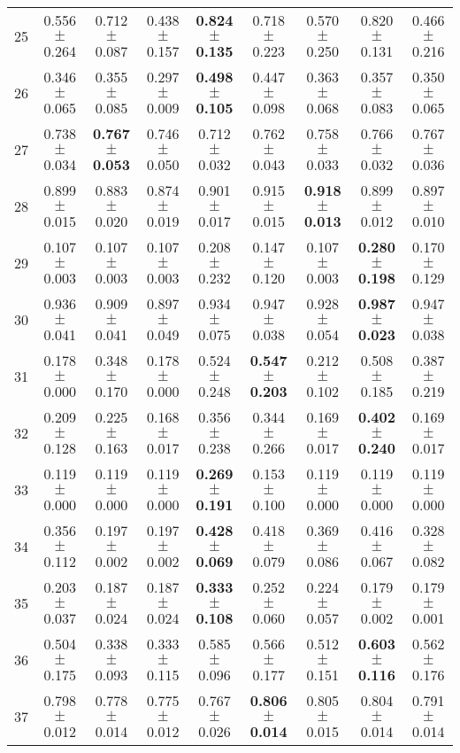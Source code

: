 \begin{table}[!ht]
{\begin{tabular}{r c c c c c c c c}
25 & 0.556 $\pm$ 0.264 & 0.712 $\pm$ 0.087 & 0.438 $\pm$ 0.157 & \textbf{0.824 $\pm$ 0.135} & 0.718 $\pm$ 0.223 & 0.570 $\pm$ 0.250 & 0.820 $\pm$ 0.131 & 0.466 $\pm$ 0.216 \\
26 & 0.346 $\pm$ 0.065 & 0.355 $\pm$ 0.085 & 0.297 $\pm$ 0.009 & \textbf{0.498 $\pm$ 0.105} & 0.447 $\pm$ 0.098 & 0.363 $\pm$ 0.068 & 0.357 $\pm$ 0.083 & 0.350 $\pm$ 0.065 \\
27 & 0.738 $\pm$ 0.034 & \textbf{0.767 $\pm$ 0.053} & 0.746 $\pm$ 0.050 & 0.712 $\pm$ 0.032 & 0.762 $\pm$ 0.043 & 0.758 $\pm$ 0.033 & 0.766 $\pm$ 0.032 & 0.767 $\pm$ 0.036 \\
28 & 0.899 $\pm$ 0.015 & 0.883 $\pm$ 0.020 & 0.874 $\pm$ 0.019 & 0.901 $\pm$ 0.017 & 0.915 $\pm$ 0.015 & \textbf{0.918 $\pm$ 0.013} & 0.899 $\pm$ 0.012 & 0.897 $\pm$ 0.010 \\
29 & 0.107 $\pm$ 0.003 & 0.107 $\pm$ 0.003 & 0.107 $\pm$ 0.003 & 0.208 $\pm$ 0.232 & 0.147 $\pm$ 0.120 & 0.107 $\pm$ 0.003 & \textbf{0.280 $\pm$ 0.198} & 0.170 $\pm$ 0.129 \\
30 & 0.936 $\pm$ 0.041 & 0.909 $\pm$ 0.041 & 0.897 $\pm$ 0.049 & 0.934 $\pm$ 0.075 & 0.947 $\pm$ 0.038 & 0.928 $\pm$ 0.054 & \textbf{0.987 $\pm$ 0.023} & 0.947 $\pm$ 0.038 \\
31 & 0.178 $\pm$ 0.000 & 0.348 $\pm$ 0.170 & 0.178 $\pm$ 0.000 & 0.524 $\pm$ 0.248 & \textbf{0.547 $\pm$ 0.203} & 0.212 $\pm$ 0.102 & 0.508 $\pm$ 0.185 & 0.387 $\pm$ 0.219 \\
32 & 0.209 $\pm$ 0.128 & 0.225 $\pm$ 0.163 & 0.168 $\pm$ 0.017 & 0.356 $\pm$ 0.238 & 0.344 $\pm$ 0.266 & 0.169 $\pm$ 0.017 & \textbf{0.402 $\pm$ 0.240} & 0.169 $\pm$ 0.017 \\
33 & 0.119 $\pm$ 0.000 & 0.119 $\pm$ 0.000 & 0.119 $\pm$ 0.000 & \textbf{0.269 $\pm$ 0.191} & 0.153 $\pm$ 0.100 & 0.119 $\pm$ 0.000 & 0.119 $\pm$ 0.000 & 0.119 $\pm$ 0.000 \\
34 & 0.356 $\pm$ 0.112 & 0.197 $\pm$ 0.002 & 0.197 $\pm$ 0.002 & \textbf{0.428 $\pm$ 0.069} & 0.418 $\pm$ 0.079 & 0.369 $\pm$ 0.086 & 0.416 $\pm$ 0.067 & 0.328 $\pm$ 0.082 \\
35 & 0.203 $\pm$ 0.037 & 0.187 $\pm$ 0.024 & 0.187 $\pm$ 0.024 & \textbf{0.333 $\pm$ 0.108} & 0.252 $\pm$ 0.060 & 0.224 $\pm$ 0.057 & 0.179 $\pm$ 0.002 & 0.179 $\pm$ 0.001 \\
36 & 0.504 $\pm$ 0.175 & 0.338 $\pm$ 0.093 & 0.333 $\pm$ 0.115 & 0.585 $\pm$ 0.096 & 0.566 $\pm$ 0.177 & 0.512 $\pm$ 0.151 & \textbf{0.603 $\pm$ 0.116} & 0.562 $\pm$ 0.176 \\
37 & 0.798 $\pm$ 0.012 & 0.778 $\pm$ 0.014 & 0.775 $\pm$ 0.012 & 0.767 $\pm$ 0.026 & \textbf{0.806 $\pm$ 0.014} & 0.805 $\pm$ 0.015 & 0.804 $\pm$ 0.014 & 0.791 $\pm$ 0.014 \\

\end{tabular}}
\end{table}

